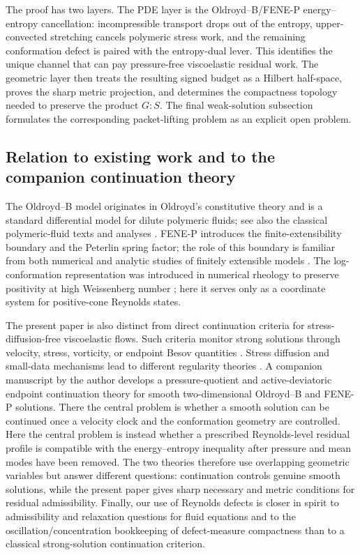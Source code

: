 \documentclass[11pt]{article}
\numberwithin{equation}{section}
\begin{document}
The proof has two layers.  The PDE layer is the Oldroyd--B/FENE-P
energy--entropy cancellation: incompressible transport drops out of the entropy,
upper-convected stretching cancels polymeric stress work, and the remaining
conformation defect is paired with the entropy-dual lever.  This identifies the
unique channel that can pay pressure-free viscoelastic residual work.  The
geometric layer then treats the resulting signed budget as a Hilbert
half-space, proves the sharp metric projection, and determines the compactness
topology needed to preserve the product \(G:S\).  The final weak-solution
subsection formulates the corresponding packet-lifting problem as an explicit
open problem.

\subsection*{Relation to existing work and to the companion continuation theory}
The Oldroyd--B model originates in Oldroyd's constitutive theory and is a
standard differential model for dilute polymeric fluids; see also the classical
polymeric-fluid texts and analyses
\cite{Oldroyd,Bird,Renardy,GuillopeSaut,LionsMasmoudi}.
FENE-P introduces the finite-extensibility boundary and the Peterlin spring
factor; the role of this boundary is familiar from both numerical and analytic
studies of finitely extensible models \cite{Bird,ChilcottRallison1988,MasmoudiFENE}.
The log-conformation representation was introduced in numerical rheology to
preserve positivity at high Weissenberg number
\cite{FattalKupferman,FattalKupferman2005}; here it serves only as a coordinate
system for positive-cone Reynolds states.

The present paper is also distinct from direct continuation criteria for
stress-diffusion-free viscoelastic flows.  Such criteria monitor strong
solutions through velocity, stress, vorticity, or endpoint Besov quantities
\cite{BealeKatoMajda,CheminMasmoudi,LeiMasmoudiZhou}.  Stress diffusion and
small-data mechanisms lead to different regularity theories
\cite{BarrettBoyaval,ConstantinKliegl,ElgindiRousset,TuWangWen}.  A companion
manuscript by the author \cite{PengEndpoint2026} develops a pressure-quotient
and active-deviatoric endpoint continuation theory for smooth two-dimensional
Oldroyd--B and FENE-P solutions.  There the central problem is whether a smooth
solution can be continued once a velocity clock and the conformation geometry
are controlled.  Here the central problem is instead whether a prescribed
Reynolds-level residual profile is compatible with the energy--entropy
inequality after pressure and mean modes have been removed.  The two theories
therefore use overlapping geometric variables but answer different questions:
continuation controls genuine smooth solutions, while the present paper gives
sharp necessary and metric conditions for residual admissibility.  Finally, our
use of Reynolds defects is closer in spirit to admissibility and relaxation
questions for fluid equations \cite{DeLellisSzekelyhidi} and to the
oscillation/concentration bookkeeping of defect-measure compactness
\cite{DiPernaMajda,LionsIncompressible,FeireislBook} than to a classical
strong-solution continuation criterion.
\end{document}
